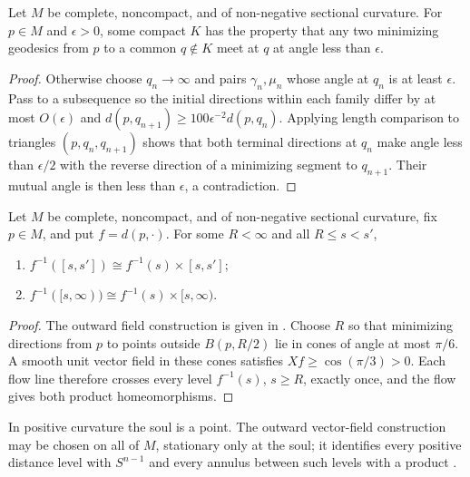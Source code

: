 \begin{lemma}
\label{lem:angle-convergence-infinity}

Let $M$ be complete, noncompact, and of non-negative sectional
curvature. For $p\in M$ and $\epsilon>0$, some compact $K$ has the
property that any two minimizing geodesics from $p$ to a common
$q\notin K$ meet at $q$ at angle less than $\epsilon$.
\end{lemma}
\begin{proof}
\sketch
{}
Otherwise choose $q_n\to\infty$ and pairs $\gamma_n,\mu_n$ whose angle
at $q_n$ is at least $\epsilon$. Pass to a subsequence so the initial
directions within each family differ by at most $O(\epsilon)$ and
$d(p,q_{n+1})\ge100\epsilon^{-2}d(p,q_n)$. Applying length comparison
to triangles $(p,q_n,q_{n+1})$ shows that both terminal directions at
$q_n$ make angle less than $\epsilon/2$ with the reverse direction of
a minimizing segment to $q_{n+1}$. Their mutual angle is then less than
$\epsilon$, a contradiction.
\end{proof}

\begin{corollary}
\label{cor:distance-level-sets-homeomorphic}
\label{homeo}

Let $M$ be complete, noncompact, and of non-negative sectional
curvature, fix $p\in M$, and put $f=d(p,\cdot)$. For some $R<\infty$
and all $R\le s<s'$,
\begin{enumerate}
\item $f^{-1}([s,s'])\cong f^{-1}(s)\times[s,s']$;
\item $f^{-1}([s,\infty))\cong f^{-1}(s)\times[s,\infty)$.
\end{enumerate}
\end{corollary}
\begin{proof}
\sketch
The outward field construction is given in \cite{Petersen}.
Choose $R$ so that minimizing directions from $p$ to points outside
$B(p,R/2)$ lie in cones of angle at most $\pi/6$. A smooth unit vector
field in these cones satisfies $Xf\ge\cos(\pi/3)>0$. Each flow line
therefore crosses every level $f^{-1}(s)$, $s\ge R$, exactly once, and
the flow gives both product homeomorphisms.
\end{proof}

In positive curvature the soul is a point. The outward vector-field
construction may be chosen on all of $M$, stationary only at the soul;
it identifies every positive distance level with $S^{n-1}$ and every
annulus between such levels with a product \cite{Petersen}.

